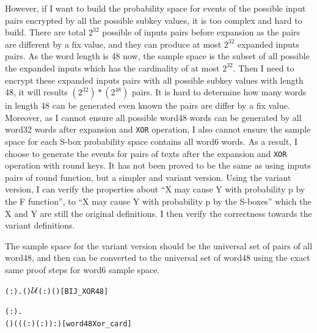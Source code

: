 \documentclass{article}
\begin{document}
However, if I want to build the probability space for events of the possible input pairs encrypted by all the possible
subkey values, it is too complex and hard to build. There are total $2^{32}$ possible of inputs pairs before expansion as the pairs
are different by a fix value, and they can produce at most $2^{32}$ expanded inputs pairs. As the word length is 48 now, the sample
space is the subset of all possible the expanded inputs which has the cardinality of at most $2^{32}$. Then I need to encrypt these
expanded inputs pairs with all possible subkey values with length 48, it will results $(2^{32})*(2^{48})$ pairs. It is hard to
determine how many words in length 48 can be generated even known the pairs are differ by a fix value. Moreover, as I cannot ensure
all possible word48 words can be generated by all word32 words after expansion and \verb|XOR| operation, I also cannot ensure the sample
space for each S-box probability space contains all word6 words. As a result, I choose to generate the events for pairs of texts after
the expansion and \verb|XOR| operation with round keys. It has not been proved to be the same as using inputs pairs of round function, but a
simpler and variant version. Using the variant version, I can verify the properties about ``X may cause Y with probability p by the F function'',
to ``X may cause Y with probability p by the S-boxes'' which the X and Y are still the original definitions.
I then verify the correctness towards the variant definitions.

The sample space for the variant version should be the universal set of pairs of all word48, and then can be converted to the universal set of
word48 using the exact same proof steps for word6 sample space.

\begin{alltt}
   \HOLTokenTurnstile{} \HOLSymConst{\HOLTokenForall{}}( :).  ( ) \ensuremath{{\cal{U}}}(:) ( )\hfill{[BIJ_XOR48]}
\end{alltt}

\begin{alltt}
   \HOLTokenTurnstile{} \HOLSymConst{\HOLTokenForall{}}( :).
      ( ) \HOLSymConst{=} ((( :) \HOLSymConst{\HOLTokenExp{}} ( :)) :)\hfill{[word48Xor_card]}
\end{alltt}
\end{document}
